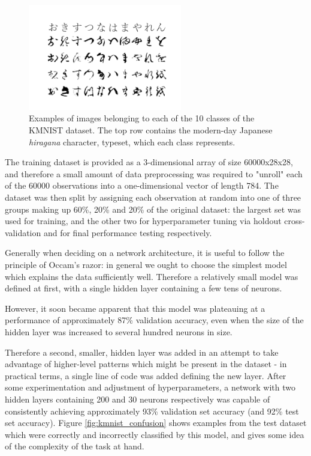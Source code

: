 \documentclass{article}[11pt]
\begin{document}
        
        \begin{figure}[h]
            \includegraphics[width=0.6\textwidth, center]{kmnist_examples}
            \caption{Examples of images belonging to each of the 10 classes of the KMNIST dataset. The top row contains the modern-day Japanese \textit{hiragana} character, typeset, which each class represents.}
            \label{fig:kmnist_examples}
        \end{figure}
        
        
        The training dataset is provided as a 3-dimensional array of size 60000x28x28, and therefore a small amount of data preprocessing was required to "unroll" each of the 60000 observations into a one-dimensional vector of length 784. The dataset was then split by assigning each observation at random into one of three groups making up 60\%, 20\% and 20\% of the original dataset: the largest set was used for training, and the other two for hyperparameter tuning via holdout cross-validation and for final performance testing respectively.
        
        Generally when deciding on a network architecture, it is useful to follow the principle of Occam's razor: in general we ought to choose the simplest model which explains the data sufficiently well. Therefore a relatively small model was defined at first, with a single hidden layer containing a few tens of neurons.
        
        However, it soon became apparent that this model was plateauing at a performance of approximately 87\% validation accuracy, even when the size of the hidden layer was increased to several hundred neurons in size.
        
        Therefore a second, smaller, hidden layer was added in an attempt to take advantage of higher-level patterns which might be present in the dataset - in practical terms, a single line of code was added defining the new layer. After some experimentation and adjustment of hyperparameters, a network with two hidden layers containing 200 and 30 neurons respectively was capable of consistently achieving approximately 93\% validation set accuracy (and 92\% test set accuracy). Figure \ref{fig:kmnist_confusion} shows examples from the test dataset which were correctly and incorrectly classified by this model, and gives some idea of the complexity of the task at hand.
        
\end{document}
